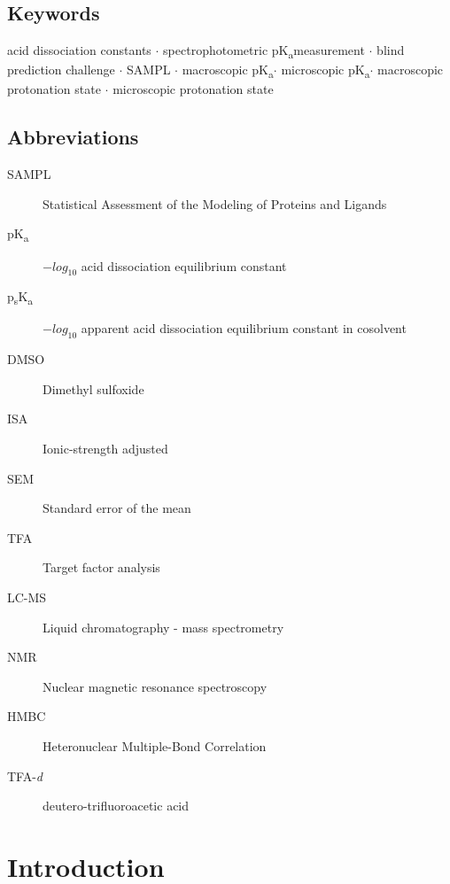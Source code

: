 \documentclass[9pt,lineno]{elife}
\newcommand{\pKa}{pK\textsubscript{a}}
\newcommand{\psKa}{p\textsubscript{s}K\textsubscript{a}}
\begin{document}
\subsection{Keywords}
acid dissociation constants $\cdot$ spectrophotometric \pKa measurement $\cdot$ blind prediction challenge $\cdot$ SAMPL $\cdot$ macroscopic \pKa $\cdot$ microscopic \pKa  $\cdot$ macroscopic protonation state $\cdot$ microscopic protonation state

\subsection{Abbreviations}
\begin{description}
\item[SAMPL] Statistical Assessment of the Modeling of Proteins and Ligands
\item[\pKa] $-log_{10}$ acid dissociation equilibrium constant
\item[\psKa] $-log_{10}$ apparent acid dissociation equilibrium constant in cosolvent
\item[DMSO] Dimethyl sulfoxide
\item[ISA] Ionic-strength adjusted
\item[SEM] Standard error of the mean
\item[TFA] Target factor analysis
\item[LC-MS] Liquid chromatography - mass spectrometry
\item[NMR] Nuclear magnetic resonance spectroscopy
\item[HMBC] Heteronuclear Multiple-Bond Correlation
\item[TFA-\textit{d}] deutero-trifluoroacetic acid
\end{description}

\section{Introduction}
\end{document}
